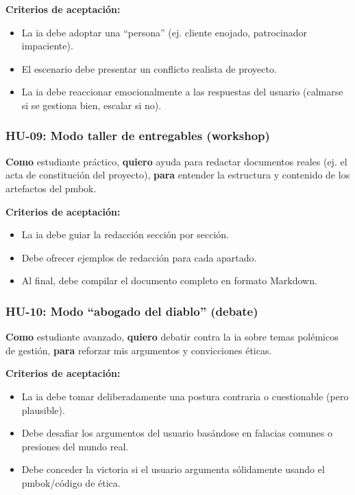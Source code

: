 \textbf{Criterios de aceptación:}
\begin{itemize}
\item La \gls{ia} debe adoptar una \enquote{persona} (ej. cliente enojado, patrocinador impaciente).
\item El escenario debe presentar un conflicto realista de proyecto.
\item La \gls{ia} debe reaccionar emocionalmente a las respuestas del usuario (calmarse si se gestiona bien, escalar si no).
\end{itemize}

\subsubsection{HU-09: Modo taller de entregables (workshop)}
\textbf{Como} estudiante práctico,
\textbf{quiero} ayuda para redactar documentos reales (ej. el acta de constitución del proyecto),
\textbf{para} entender la estructura y contenido de los artefactos del \gls{pmbok}.

\textbf{Criterios de aceptación:}
\begin{itemize}
\item La \gls{ia} debe guiar la redacción sección por sección.
\item Debe ofrecer ejemplos de redacción para cada apartado.
\item Al final, debe compilar el documento completo en formato Markdown.
\end{itemize}

\subsubsection{HU-10: Modo \enquote{abogado del diablo} (debate)}
\textbf{Como} estudiante avanzado,
\textbf{quiero} debatir contra la \gls{ia} sobre temas polémicos de gestión,
\textbf{para} reforzar mis argumentos y convicciones éticas.

\textbf{Criterios de aceptación:}
\begin{itemize}
\item La \gls{ia} debe tomar deliberadamente una postura contraria o cuestionable (pero plausible).
\item Debe desafiar los argumentos del usuario basándose en falacias comunes o presiones del mundo real.
\item Debe conceder la victoria si el usuario argumenta sólidamente usando el \gls{pmbok}/código de ética.
\end{itemize}

